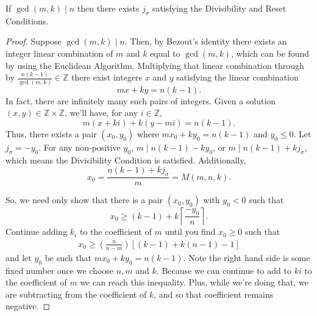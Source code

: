 \documentclass[10pt,a4paper]{amsart}
\begin{document}
\begin{lemma}\label{lem:jsigexists}
    If $\gcd(m,k)\mid n$ then there exists $j_\sigma$ satisfying the Divisibility and Reset Conditions.
\end{lemma}

\begin{proof}
    Suppose $\gcd(m,k)\mid n$. Then, by Bezout's identity there exists an integer linear combination of $m$ and $k$ equal to $\gcd(m,k)$, which can be found by using the Euclidean Algorithm. Multiplying that linear combination through by $\frac{n(k-1)}{\gcd(m,k)}\in\mathbb{Z}$ there exist integers $x$ and $y$ satisfying the linear combination
    $$mx+ky = n(k-1).$$
    In fact, there are infinitely many such pairs of integers. Given a solution $(x,y)\in\mathbb{Z}\times \mathbb{Z}$, we'll have, for any $i\in\mathbb{Z}$,
    $$m(x+ki) + k(y-mi) = n(k-1).$$
    Thus, there exists a pair $(x_0, y_0)$ where $mx_0+ky_0 = n(k-1)$ and $y_0\leq 0$. Let $j_\sigma = -y_0$. For any non-positive $y_0$, $m\mid n(k-1)-ky_0$, or $m\mid n(k-1)+ kj_\sigma$, which means the Divisibility Condition is satisfied. Additionally,
    $$x_0 = \frac{n(k-1) +kj_\sigma}{m} = M(m,n,k).$$

    So, we need only show that there is a pair $(x_0,y_0)$ with $y_0<0$ such that 
    $$x_0 \geq (k-1) + k \left\lceil \frac{-y_0}{n}\right\rceil.$$
    Continue adding $k_i$ to the coefficient of $m$ until you find $x_0\geq 0$ such that
        \begin{align}
            x_0 \geq \left( \frac{n}{n-m}\right) [(k-1)+k(n-1)-1] \label{ineq:choosex0}
        \end{align}
    and let $y_0$ be such that $mx_0+ky_0 = n(k-1)$.
    Note the right hand side is some fixed number once we choose $n,m$ and $k$. Because we can continue to add to $ki$ to the coefficient of $m$ we can reach this inequality. Plus, while we're doing that, we are subtracting from the coefficient of $k$, and so that coefficient remains negative.


\end{proof}
\end{document}
